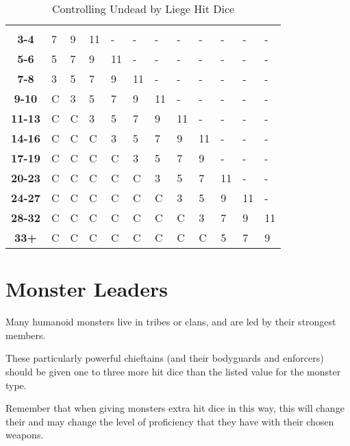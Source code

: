 \begin{multicols*}{2}
\begin {table}[H]
  \caption{Controlling Undead by Liege Hit Dice}\label{tab:Controlling Undead by Liege Hit Dice}
	\begin{tabularx}{\columnwidth}{>{\bfseries}cYYYYYYYYYYY}
		 &  &  &  &  &  &  &  &  &  &  & \\
	3-4 & 7 & 9 & 11 & - & - & - & - & - & - & - & -\\
	5-6 & 5 & 7 & 9 & 11 & - & - & - & - & - & - & -\\
	7-8 & 3 & 5 & 7 & 9 & 11 & - & - & - & - & - & -\\
	9-10 & C & 3 & 5 & 7 & 9 & 11 & - & - & - & - & -\\
	11-13 & C & C & 3 & 5 & 7 & 9 & 11 & - & - & - & -\\
	14-16 & C & C & C & 3 & 5 & 7 & 9 & 11 & - & - & -\\
	17-19 & C & C & C & C & 3 & 5 & 7 & 9 & - & - & -\\
	20-23 & C & C & C & C & C & 3 & 5 & 7 & 11 & - & -\\
	24-27 & C & C & C & C & C & C & 3 & 5 & 9 & 11 & -\\
	28-32 & C & C & C & C & C & C & C & 3 & 7 & 9 & 11\\
	33+ & C & C & C & C & C & C & C & C & 5 & 7 & 9
  \end {tabularx}
\end {table}

\section{Monster Leaders}
Many humanoid monsters live in tribes or clans, and are led by their strongest members.

These particularly powerful chieftains (and their bodyguards and enforcers) should be given one to three more hit dice than the listed value for the monster type.

Remember that when giving monsters extra hit dice in this way, this will change their  and may change the level of proficiency that they have with their chosen weapons.


\end{multicols*}
